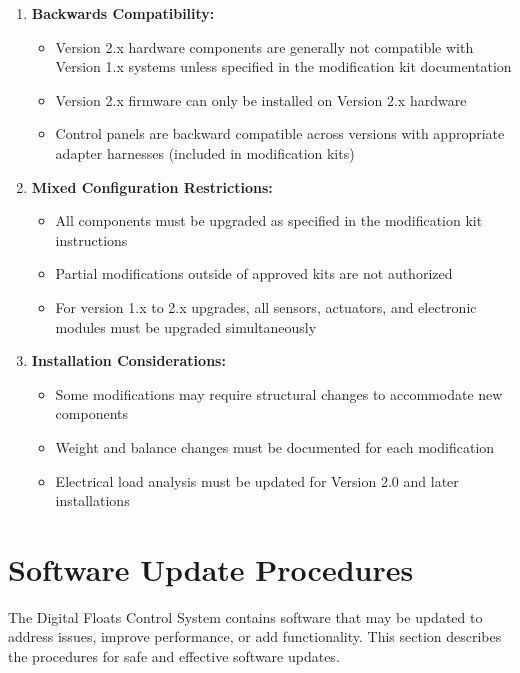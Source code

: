 \documentclass[12pt,a4paper,twoside,openright]{book}
\begin{document}
\begin{enumerate}
    \item \textbf{Backwards Compatibility:}
    \begin{itemize}
        \item Version 2.x hardware components are generally not compatible with Version 1.x systems unless specified in the modification kit documentation
        \item Version 2.x firmware can only be installed on Version 2.x hardware
        \item Control panels are backward compatible across versions with appropriate adapter harnesses (included in modification kits)
    \end{itemize}
    
    \item \textbf{Mixed Configuration Restrictions:}
    \begin{itemize}
        \item All components must be upgraded as specified in the modification kit instructions
        \item Partial modifications outside of approved kits are not authorized
        \item For version 1.x to 2.x upgrades, all sensors, actuators, and electronic modules must be upgraded simultaneously
    \end{itemize}
    
    \item \textbf{Installation Considerations:}
    \begin{itemize}
        \item Some modifications may require structural changes to accommodate new components
        \item Weight and balance changes must be documented for each modification
        \item Electrical load analysis must be updated for Version 2.0 and later installations
    \end{itemize}
\end{enumerate}

\section{Software Update Procedures}

The Digital Floats Control System contains software that may be updated to address issues, improve performance, or add functionality. This section describes the procedures for safe and effective software updates.
\end{document}
